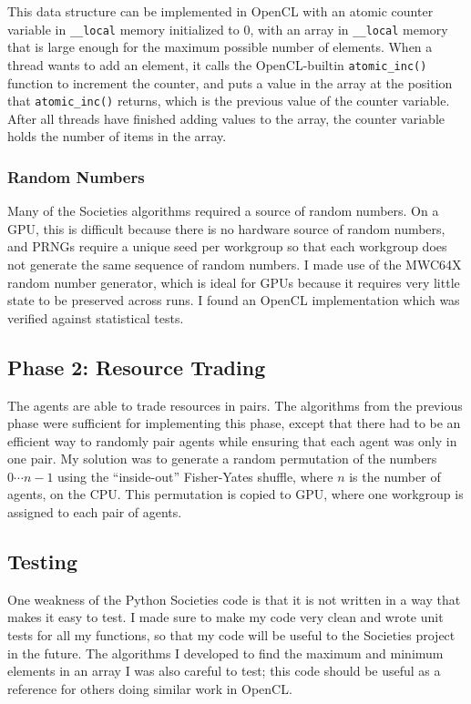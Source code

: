 \documentclass{article}
\begin{document}
This data structure can be implemented in OpenCL with an atomic counter variable in \texttt{\_\_local} memory initialized to 0, with an array in \texttt{\_\_local} memory that is large enough for the maximum possible number of elements. When a thread wants to add an element, it calls the OpenCL-builtin \texttt{atomic\_inc()} function to increment the counter, and puts a value in the array at the position that \texttt{atomic\_inc()} returns, which is the previous value of the counter variable. After all threads have finished adding values to the array, the counter variable holds the number of items in the array.

\subsubsection{Random Numbers}
Many of the Societies algorithms required a source of random numbers. On a GPU, this is difficult because there is no hardware source of random numbers, and PRNGs require a unique seed per workgroup so that each workgroup does not generate the same sequence of random numbers. I made use of the MWC64X random number generator, which is ideal for GPUs because it requires very little state to be preserved across runs. I found an OpenCL implementation which was verified against statistical tests.\cite{mwc64x}

\subsection{Phase 2: Resource Trading}
The agents are able to trade resources in pairs. The algorithms from the previous phase were sufficient for implementing this phase, except that there had to be an efficient way to randomly pair agents while ensuring that each agent was only in one pair. My solution was to generate a random permutation of the numbers $0 \cdots n-1$ using the ``inside-out'' Fisher-Yates shuffle, where $n$ is the number of agents, on the CPU. This permutation is copied to GPU, where one workgroup is assigned to each pair of agents.

\subsection{Testing}
One weakness of the Python Societies code is that it is not written in a way that makes it easy to test. I made sure to make my code very clean  and wrote unit tests for all my functions, so that my code will be useful to the Societies project in the future. The algorithms I developed to find the maximum and minimum elements in an array I was also careful to test; this code should be useful as a reference for others doing similar work in OpenCL.
\end{document}
